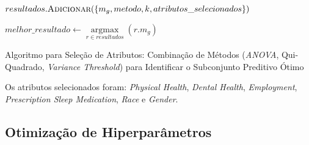 \documentclass[12pt]{article}
\begin{document}
\begin{adjustbox}{width=\textwidth}
\begin{algorithm}[H]
{{{            $resultados.\textsc{Adicionar}(\{m_g, metodo, k, atributos\_selecionados\})$\\
        }
    }{%
    }
}

$melhor\_resultado \leftarrow \underset{r \in resultados}{\operatorname{argmax}}(r.m_g)$\\
\caption{Algoritmo para Seleção de Atributos: Combinação de Métodos (\textit{ANOVA}, Qui-Quadrado, \textit{Variance Threshold}) para Identificar o Subconjunto Preditivo Ótimo} %
\label{alg:selecao_atributos} 
\end{algorithm}
\end{adjustbox}

Os atributos selecionados foram: \textit{Physical Health}, \textit{Dental Health}, \textit{Employment}, \textit{Prescription Sleep Medication}, \textit{Race} e \textit{Gender}.

\subsection{Otimização de Hiperparâmetros} 
\end{document}
